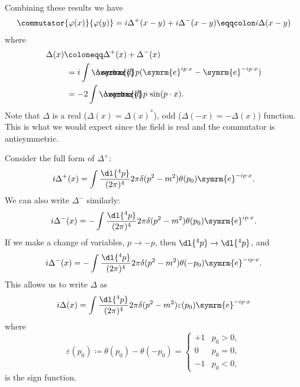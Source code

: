 \documentclass[fleqn]{NotesClass}
\newcommand{\e}{\symrm{e}}
\newcommand\dbar{\ThisStyle{\ensurestackMath{%
            \stackengine{-.3\LMpt}{\SavedStyle \symrm{d}}{\SavedStyle\overbar{}%
                \mkern2.25mu}{O}{r}{F}{F}{L}}}}
\newcommand{\invariantmeasure}[1]{\dbar #1}
\newcommand{\heaviside}{\theta}
\begin{document}
    Combining these results we have
    \begin{align}
        \commutator{\varphi(x)}{\varphi(y)} = i\Delta^+(x - y) + i\Delta^-(x - y) \eqqcolon i\Delta(x - y)
    \end{align}
    where
    \begin{align}
        \Delta(x) &\coloneqq \Delta^+(x) + \Delta^-(x)\\
        &\hphantom{:}= i \int \invariantmeasure{p} (\e^{ip\cdot x} - \e^{-ip\cdot x})\\
        &\hphantom{:}= -2\int \invariantmeasure{p} \, \sin (p \cdot x).
    \end{align}
    Note that \(\Delta\) is a real (\(\Delta(x) = \Delta(x)^*\)), odd (\(\Delta(-x) = -\Delta(x)\)) function.
    This is what we would expect since the field is real and the commutator is antisymmetric.
    
    Consider the full form of \(\Delta^+\):
    \begin{equation}
        i\Delta^+(x) = \int \frac{\dl{^4p}}{(2\pi)^4} 2\pi \delta(p^2 - m^2) \heaviside(p_0) \e^{-ip\cdot x}.
    \end{equation}
    We can also write \(\Delta^-\) similarly:
    \begin{equation}
        i\Delta^-(x) = -\int \frac{\dl{^4p}}{(2\pi)^4} 2\pi \delta(p^2 - m^2) \heaviside(p_0) \e^{ip\cdot x}.
    \end{equation}
    If we make a change of variables, \(p \to -p\), then \(\dl{^4p} \to \dl{^4p}\), and
    \begin{equation}
        i\Delta^-(x) = -\int \frac{\dl{^4p}}{(2\pi)^4} 2\pi\delta(p^2 - m^2) \heaviside(-p_0) \e^{-ip\cdot x}.
    \end{equation}
    This allows us to write \(\Delta\) as
    \begin{equation}
        i\Delta(x) = \int \frac{\dl{^4p}}{(2\pi)^4} 2\pi \delta(p^2 - m^2) \varepsilon(p_0) \e^{-ip\cdot x}
    \end{equation}
    where
    \begin{equation}
        \varepsilon(p_0) \coloneqq \heaviside(p_0) - \heaviside(-p_0) = 
        \begin{cases}
            + 1 & p_0 > 0,\\
            0 & p_0 = 0,\\
            -1 & p_0 < 0,
        \end{cases}
    \end{equation}
    is the sign function.
    
\end{document}
